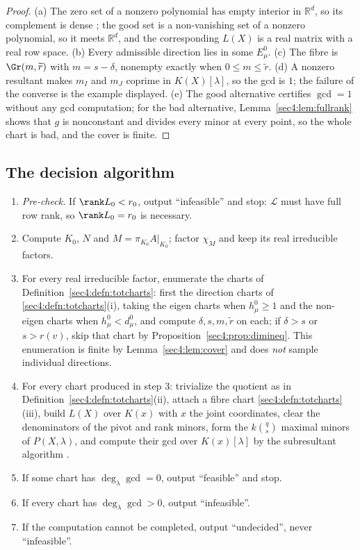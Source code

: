 \begin{proof}
(a) The zero set of a nonzero polynomial has empty interior in $\mathbb R^d$, so its complement is
dense \cite{bpr06}; the good set is a non-vanishing set of a nonzero polynomial, so it meets
$\mathbb R^d$, and the corresponding $L(X)$ is a real matrix with a real row space.
(b) Every admissible direction lies in some $E_\mu^0$.
(c) The fibre is $\Gr(m,\widetilde r)$ with $m=s-\delta$, nonempty exactly when
$0\le m\le\widetilde r$.
(d) A nonzero resultant makes $m_I$ and $m_J$ coprime in $K(X)[\lambda]$, so the gcd is $1$; the
failure of the converse is the example displayed.
(e) The good alternative certifies $\gcd=1$ without any gcd computation; for the bad alternative,
Lemma~\ref{sec4:lem:fullrank} shows that $g$ is nonconstant and divides every minor at every point, so
the whole chart is bad, and the cover is finite.
\end{proof}

\subsection{The decision algorithm}
\label{sec4:algorithm}

\begin{algo}
\label{sec4:algo:decide}
\begin{enumerate}
\item \emph{Pre-check.} If $\rank L_0<r_0$, output ``infeasible'' and stop: $\mathcal L$ must have
full row rank, so $\rank L_0=r_0$ is necessary.
\item Compute $K_0$, $N$ and $M=\pi_{K_0}A|_{K_0}$; factor $\chi_M$ and keep its real irreducible
factors.
\item For every real irreducible factor, enumerate the charts of Definition~\ref{sec4:defn:totcharts}:
first the direction charts of \ref{sec4:defn:totcharts}(i), taking the eigen charts when
$h_\mu^0\ge1$ and the non-eigen charts when $h_\mu^0<d_\mu^0$, and compute $\delta,s,m,\widetilde r$ on
each; if $\delta>s$ or $s>r(v)$, skip that chart by Proposition~\ref{sec4:prop:dimineq}. This
enumeration is finite by Lemma~\ref{sec4:lem:cover} and does \emph{not} sample individual directions.
\item For every chart produced in step 3: trivialize the quotient as in
Definition~\ref{sec4:defn:totcharts}(ii), attach a fibre chart \ref{sec4:defn:totcharts}(iii), build
$L(X)$ over $K(x)$ with $x$ the joint coordinates, clear the denominators of the pivot and rank minors,
form the $k\binom{q}{s}$ maximal minors of $P(X,\lambda)$, and compute their gcd over $K(x)[\lambda]$
by the subresultant algorithm \cite{vzgg03}.
\item If some chart has $\deg_\lambda\gcd=0$, output ``feasible'' and stop.
\item If every chart has $\deg_\lambda\gcd>0$, output ``infeasible''.
\item If the computation cannot be completed, output ``undecided'', never ``infeasible''.
\end{enumerate}
\end{algo}

